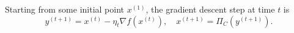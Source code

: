 \documentclass[openany]{book}
\theoremstyle{definition}
\theoremstyle{remark}
\begin{document}
\begin{comment}
Consider $\underline{f}(x)$. We have for any $\lambda\in\Delta_T$,
\begin{equation*}
    \underline{f}(x)\ge \sum_{t=1}^{T}\lambda_t\left(f(x^{(t)})+\langle\nabla f(x^{(t)}),x-x^{(t)}\rangle\right),
\end{equation*}
or
\begin{equation}\label{gradBasedConv}
    \sum_{t=1}^{T}\lambda_t f(x^{(t)})-\underline{f}(x)\le \sum_{t=1}^{T}\lambda_t \langle\nabla f(x^{(t)}),x^{(t)}-x\rangle.
\end{equation}
Thus in general, we can output $\tilde{x}^{(T)}=\arg\min_{1\le t\le T}f(x^{(t)})$ or $\sum_{t=1}^{T}\lambda_tx^{(t)}$ (or any point in the sublevel set of $\overline{f}$ given by this point), and try to bound the right hand side of \eqref{gradBasedConv}. Or we can output $\tilde{x}^{(T)}$, whose guarantee is bounded by the minimum of the right hand side of \eqref{gradBasedConv} when all $\lambda\in\Delta_T$ is considered.
\end{comment}

Starting from some initial point $x^{(1)}$, the gradient descent step at time $t$ is
\begin{equation}\label{gradUpdate}
y^{(t+1)}=x^{(t)}-\eta_t\nabla f(x^{(t)}),\quad x^{(t+1)}=\Pi_C\left(y^{(t+1)}\right).
\end{equation}
\end{document}
